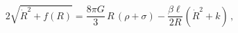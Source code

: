 \begin{equation}2\sqrt{\dot{R}^2+f(R)}=\frac{8\pi G}{3}\,R\,(\rho+\sigma)-
\frac{\beta\ell}{2R}\left(\dot{R}^2+k\right)\,,\end{equation}

